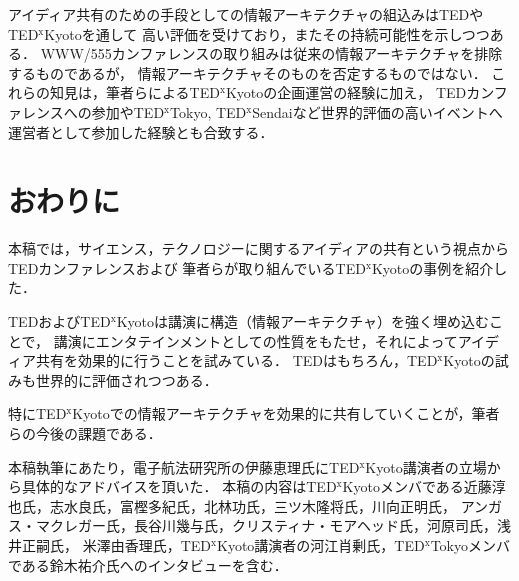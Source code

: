 \documentclass[submit,techreq,jkeyword,noauthor]{ipsj}
\newcommand{\TED}{\textrm{TED}}
\newcommand{\TEDx}{\TED${}^{\textrm{x}}$}
\newcommand{\TEDxTokyo}{\TEDx\textrm{Tokyo}}
\newcommand{\TEDxKyoto}{\TEDx\-\textrm{Kyoto}}
\newcommand{\TEDxSendai}{\TEDx\textrm{Sendai}}
\begin{document}
アイディア共有のための手段としての情報アーキテクチャの組込みは\TED や\TEDxKyoto を通して
高い評価を受けており，またその持続可能性を示しつつある．
WWW/555カンファレンスの取り組みは従来の情報アーキテクチャを排除するものであるが，
情報アーキテクチャそのものを否定するものではない．
これらの知見は，筆者らによる\TEDxKyoto の企画運営の経験に加え，
\TED カンファレンスへの参加や\TEDxTokyo, \TEDxSendai など世界的評価の高いイベントへ
運営者として参加した経験とも合致する．



\section{おわりに}

本稿では，サイエンス，テクノロジーに関するアイディアの共有という視点から\TED カンファレンスおよび
筆者らが取り組んでいる\TEDxKyoto の事例を紹介した．

\TED および\TEDxKyoto は講演に構造（情報アーキテクチャ）を強く埋め込むことで，
講演にエンタテインメントとしての性質をもたせ，それによってアイディア共有を効果的に行うことを試みている．
\TED はもちろん，\TEDxKyoto の試みも世界的に評価されつつある．

特に\TEDxKyoto での情報アーキテクチャを効果的に共有していくことが，筆者らの今後の課題である．

\begin{acknowledgment}
\begingroup\footnotesize
本稿執筆にあたり，電子航法研究所の伊藤恵理氏に\TEDxKyoto 講演者の立場から具体的なアドバイスを頂いた．
本稿の内容は\TEDxKyoto メンバである近藤淳也氏，志水良氏，富樫多紀氏，北林功氏，三ツ木隆将氏，川向正明氏，
アンガス・マクレガー氏，長谷川幾与氏，クリスティナ・モアヘッド氏，河原司氏，浅井正嗣氏，
米澤由香理氏，\TEDxKyoto 講演者の河江肖剰氏，\TEDxTokyo メンバである鈴木祐介氏へのインタビューを含む．
\endgroup
\end{acknowledgment}
\end{document}
